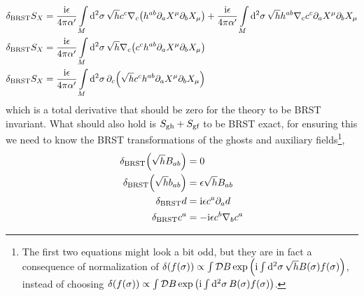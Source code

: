 \begin{align*}
    \delta_{\textnormal{BRST}}S_X&=\frac{\textnormal{i}\epsilon}{4\pi\alpha'}\int\limits_{M}\dd[2]{\sigma}\sqrt{h}c^c\nabla_c\qty(h^{ab}\partial_aX^\mu \partial_bX_\mu)+\frac{\textnormal{i}\epsilon}{4\pi\alpha'}\int\limits_{M}\dd[2]{\sigma}\sqrt{h}h^{ab}\nabla_cc^c\partial_aX^\mu\partial_b X_\mu\\
    \delta_{\textnormal{BRST}}S_X&=\frac{\textnormal{i}\epsilon}{4\pi\alpha'}\int\limits_{M}\dd[2]{\sigma}\sqrt{h}\nabla_c\qty(c^c h^{ab}\partial_aX^\mu \partial_bX_\mu)\\
    \delta_{\textnormal{BRST}}S_X&=\frac{\textnormal{i}\epsilon}{4\pi\alpha'}\int\limits_{M}\dd[2]{\sigma}\partial_c\qty(\sqrt{h}c^c h^{ab}\partial_aX^\mu \partial_bX_\mu)
\end{align*}
which is a total derivative that should be zero for the theory to be BRST invariant. What should also hold is $S_{\textnormal{gh}}+S_{\textnormal{gf}}$ 
to be BRST exact, for ensuring this we need to know the BRST transformations of the ghosts and auxiliary fields\footnote{The first two equations might look a bit odd, but they are in fact a consequence of 
normalization of $\delta\qty(f\qty(\sigma))\propto\int\mathcal D B\exp\qty(\textnormal{i}\int\dd[2]{\sigma}\sqrt{h}B\qty(\sigma)f\qty(\sigma))$, instead of choosing $\delta\qty(f\qty(\sigma))\propto\int\mathcal D B\exp\qty(\textnormal{i}\int\dd[2]{\sigma}B\qty(\sigma)f\qty(\sigma))$.},
\begin{align*}
    \delta_{\textnormal{BRST}}\qty(\sqrt{h}B_{ab})&=0\\
    \delta_{\textnormal{BRST}}\qty(\sqrt{h}b_{ab})&=\epsilon\sqrt{h} B_{ab}\\
    \delta_{\textnormal{BRST}} d&=\textnormal{i}\epsilon c^a\partial_a d\\
    \delta_{\textnormal{BRST}} c^a&=-\textnormal{i}\epsilon c^b\nabla_b c^a
\end{align*}

